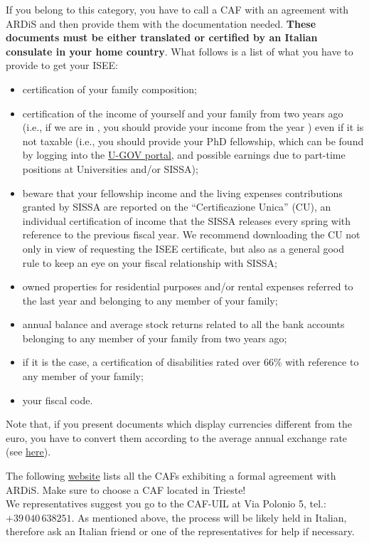 \documentclass{sissavademecum}
\begin{document}
If you belong to this category, you have to call a CAF with an agreement with ARDiS and then provide them with the documentation needed. \textbf{These documents must be either translated or certified by an Italian consulate in your home country}. What follows is a list of what you have to provide to get your ISEE:
\begin{itemize}
    \item certification of your family composition;
    \item certification of the income of yourself and your family from two years ago (i.e., if we are in \the\year, you should provide your income from the year \the\year) even if it is not taxable (i.e., you should provide your PhD fellowship, which can be found by logging into the \href{https://www.sissa.u-gov.it/u-gov-ru/bp/desktop.RU99CEDOLID_1914958969.RU99CEDOL/siaru/cedolini/cedolini_main.iface}{U-GOV portal}, and possible earnings due to part-time positions at Universities and/or SISSA);
    \item beware that your fellowship income and the living expenses contributions granted by SISSA are reported on the ``Certificazione Unica'' (CU), an individual certification of income that the SISSA releases every spring with reference to the previous fiscal year. We recommend downloading the CU not only in view of requesting the ISEE certificate, but also as a general good rule to keep an eye on your fiscal relationship with SISSA;
    \item owned properties for residential purposes and/or rental expenses referred to the last year and belonging to any member of your family;
    \item annual balance and average stock returns related to all the bank accounts belonging to any member of your family from two years ago;
    \item if it is the case, a certification of disabilities rated over $66\%$ with reference to any member of your family;
    \item your fiscal code.
\end{itemize}
Note that, if you present documents which display currencies different from the euro, you have to convert them according to the average annual exchange rate (see \href{https://tassidicambio.bancaditalia.it/terzevalute-wf-ui-web/averageRates}{here}).
    
The following \href{http://www.ardiss.fvg.it/contenuti.php?view=news&id=9518&tipo=evidenza}{website} lists all the CAFs exhibiting a formal agreement with ARDiS. Make sure to choose a CAF located in Trieste! \\
We representatives suggest you go to the CAF-UIL at Via Polonio 5, tel.: $+39 \, 040 \, 638251$. As mentioned above, the process will be likely held in Italian, therefore ask an Italian friend or one of the representatives for help if necessary.
\end{document}
